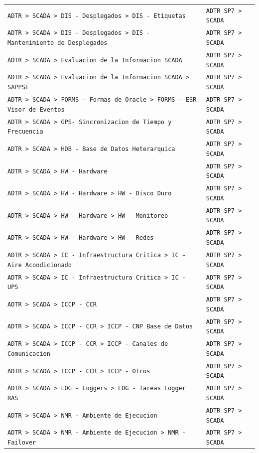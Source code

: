 \begin{longtable}{>{\raggedright\arraybackslash}p{} >{\raggedright\arraybackslash}p{}}
\texttt{ADTR > SCADA > DIS - Desplegados > DIS - Etiquetas} & \texttt{ADTR SP7 > SCADA} \\
\texttt{ADTR > SCADA > DIS - Desplegados > DIS - Mantenimiento de Desplegados} & \texttt{ADTR SP7 > SCADA} \\
\texttt{ADTR > SCADA > Evaluacion de la Informacion SCADA} & \texttt{ADTR SP7 > SCADA} \\
\texttt{ADTR > SCADA > Evaluacion de la Informacion SCADA > SAPPSE} & \texttt{ADTR SP7 > SCADA} \\
\texttt{ADTR > SCADA > FORMS - Formas de Oracle > FORMS - ESR Visor de Eventos} & \texttt{ADTR SP7 > SCADA} \\
\texttt{ADTR > SCADA > GPS- Sincronizacion de Tiempo y Frecuencia} & \texttt{ADTR SP7 > SCADA} \\
\texttt{ADTR > SCADA > HDB - Base de Datos Heterarquica} & \texttt{ADTR SP7 > SCADA} \\
\texttt{ADTR > SCADA > HW - Hardware} & \texttt{ADTR SP7 > SCADA} \\
\texttt{ADTR > SCADA > HW - Hardware > HW - Disco Duro} & \texttt{ADTR SP7 > SCADA} \\
\texttt{ADTR > SCADA > HW - Hardware > HW - Monitoreo} & \texttt{ADTR SP7 > SCADA} \\
\texttt{ADTR > SCADA > HW - Hardware > HW - Redes} & \texttt{ADTR SP7 > SCADA} \\
\texttt{ADTR > SCADA > IC - Infraestructura Critica > IC - Aire Acondicionado} & \texttt{ADTR SP7 > SCADA} \\
\texttt{ADTR > SCADA > IC - Infraestructura Critica > IC - UPS} & \texttt{ADTR SP7 > SCADA} \\
\texttt{ADTR > SCADA > ICCP - CCR} & \texttt{ADTR SP7 > SCADA} \\
\texttt{ADTR > SCADA > ICCP - CCR > ICCP - CNP Base de Datos} & \texttt{ADTR SP7 > SCADA} \\
\texttt{ADTR > SCADA > ICCP - CCR > ICCP - Canales de Comunicacion} & \texttt{ADTR SP7 > SCADA} \\
\texttt{ADTR > SCADA > ICCP - CCR > ICCP - Otros} & \texttt{ADTR SP7 > SCADA} \\
\texttt{ADTR > SCADA > LOG - Loggers > LOG - Tareas Logger RAS} & \texttt{ADTR SP7 > SCADA} \\
\texttt{ADTR > SCADA > NMR - Ambiente de Ejecucion} & \texttt{ADTR SP7 > SCADA} \\
\texttt{ADTR > SCADA > NMR - Ambiente de Ejecucion > NMR - Failover} & \texttt{ADTR SP7 > SCADA} \\

\end{longtable}
